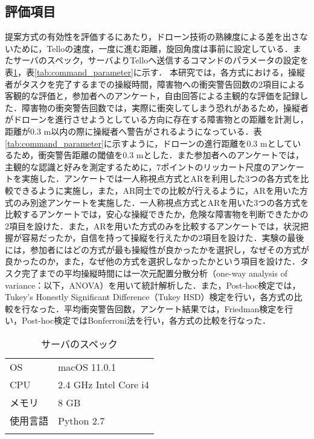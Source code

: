 \documentclass[submit]{ipsj}
\begin{document}
\subsection{評価項目}
提案方式の有効性を評価するにあたり，ドローン技術の熟練度による差を出さないために，Telloの速度，一度に進む距離，旋回角度は事前に設定している．またサーバのスペック，サーバよりTelloへ送信するコマンドのパラメータの設定を表\ref{tab:server_spec}，表\ref{tab:command_parameter}に示す．
本研究では，各方式における，操縦者がタスクを完了するまでの操縦時間，障害物への衝突警告回数の2項目による客観的な評価と，参加者へのアンケート，自由回答による主観的な評価を記録した．障害物の衝突警告回数では，実際に衝突してしまう恐れがあるため，操縦者がドローンを進行させようとしている方向に存在する障害物との距離を計測し，距離が0.3 m以内の際に操縦者へ警告がされるようになっている．表\ref{tab:command_parameter}に示すように，ドローンの進行距離を0.3 mとしているため，衝突警告距離の閾値を0.3 mとした．また参加者へのアンケートでは，主観的な認識と好みを測定するために，7ポイントのリッカート尺度のアンケートを実施した．アンケートでは一人称視点方式とARを利用した3つの各方式を比較できるように実施し，また，AR同士での比較が行えるように，ARを用いた方式のみ別途アンケートを実施した．一人称視点方式とARを用いた3つの各方式を比較するアンケートでは，安心な操縦できたか，危険な障害物を判断できたかの2項目を設けた．また，ARを用いた方式のみを比較するアンケートでは，状況把握が容易だったか，自信を持って操縦を行えたかの2項目を設けた．実験の最後には，参加者にはどの方式が最も操縦性が良かったかを選択し，なぜその方式が良かったのか，また，なぜ他の方式を選択しなかったかという項目を設けた．タスク完了までの平均操縦時間には一次元配置分散分析（one-way analysis of variance：以下，ANOVA）を用いて統計解析した．また，Post-hoc検定では，Tukey’s Honestly Significant Difference（Tukey HSD）検定を行い，各方式の比較を行なった．平均衝突警告回数，アンケート結果では，Friedman検定を行い，Post-hoc検定ではBonferroni法を行い，各方式の比較を行なった．


\begin{table}[tb]
  \caption{サーバのスペック}
  \label{tab:server_spec}
  \centering
  \begin{tabular}{ll}
  \noalign{\smallskip}\hline\noalign{\smallskip}
    OS     & macOS 11.0.1       \\
    CPU     & 2.4 GHz Intel Core i4       \\
    メモリ     & 8 GB       \\ 
    使用言語     & Python 2.7       \\
    \noalign{\smallskip}\hline
  \end{tabular}
\end{table}
\end{document}
